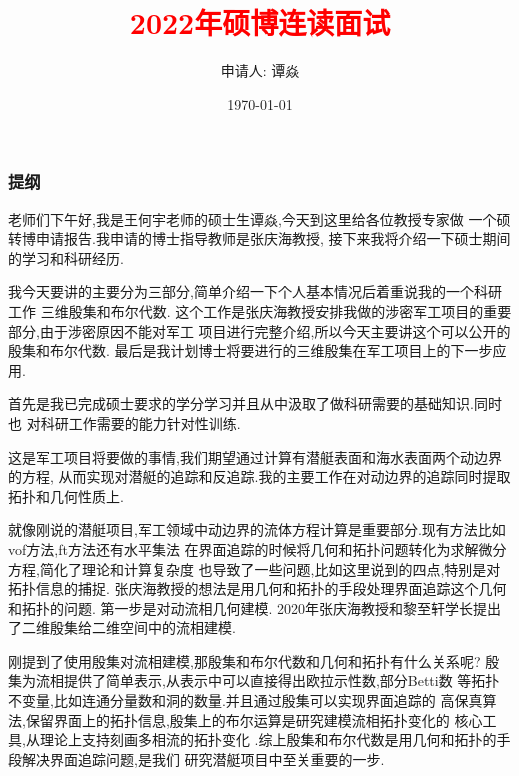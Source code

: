 \documentclass[UTF8]{ctexbeamer}	%
\title{\textcolor{red}{2022年硕博连读面试}}
\author{申请人: 谭焱 
 }
\institute{\small{现硕士导师: 王何宇 、张庆海 \newline 拟转博士指导教师: 张庆海} \newline   \newline 浙江大学数学科学学院}
\date{\today}
\theoremstyle{plain}
\theoremstyle{definition}
\theoremstyle{remark}
\numberwithin{equation}{section}
\begin{document}
\begin{frame}
  \titlepage
\end{frame}


\begin{frame}
  \frametitle{提纲}
  \tableofcontents
\end{frame}

\begin{frame}
  老师们下午好,我是王何宇老师的硕士生谭焱,今天到这里给各位教授专家做
  一个硕转博申请报告.我申请的博士指导教师是张庆海教授,
  接下来我将介绍一下硕士期间的学习和科研经历.
\end{frame}

\begin{frame}
  我今天要讲的主要分为三部分,简单介绍一下个人基本情况后着重说我的一个科研工作
  三维殷集和布尔代数.
  这个工作是张庆海教授安排我做的涉密军工项目的重要部分,由于涉密原因不能对军工
  项目进行完整介绍,所以今天主要讲这个可以公开的殷集和布尔代数.
  最后是我计划博士将要进行的三维殷集在军工项目上的下一步应用.
\end{frame}

\begin{frame}
  首先是我已完成硕士要求的学分学习并且从中汲取了做科研需要的基础知识.同时也
  对科研工作需要的能力针对性训练.
\end{frame}

\begin{frame}
  这是军工项目将要做的事情,我们期望通过计算有潜艇表面和海水表面两个动边界的方程,
  从而实现对潜艇的追踪和反追踪.我的主要工作在对动边界的追踪同时提取
  拓扑和几何性质上.
\end{frame}

\begin{frame}
  就像刚说的潜艇项目,军工领域中动边界的流体方程计算是重要部分.现有方法比如
  vof方法,ft方法还有水平集法
  在界面追踪的时候将几何和拓扑问题转化为求解微分方程,简化了理论和计算复杂度
  也导致了一些问题,比如这里说到的四点,特别是对拓扑信息的捕捉.
  张庆海教授的想法是用几何和拓扑的手段处理界面追踪这个几何和拓扑的问题.
  第一步是对动流相几何建模.
  2020年张庆海教授和黎至轩学长提出了二维殷集给二维空间中的流相建模.
\end{frame}

\begin{frame}
  刚提到了使用殷集对流相建模,那殷集和布尔代数和几何和拓扑有什么关系呢?
  殷集为流相提供了简单表示,从表示中可以直接得出欧拉示性数,部分Betti数
  等拓扑不变量,比如连通分量数和洞的数量.并且通过殷集可以实现界面追踪的
  高保真算法,保留界面上的拓扑信息,殷集上的布尔运算是研究建模流相拓扑变化的
  核心工具,从理论上支持刻画多相流的拓扑变化
  .综上殷集和布尔代数是用几何和拓扑的手段解决界面追踪问题,是我们
  研究潜艇项目中至关重要的一步.
\end{frame}
\end{document}
